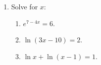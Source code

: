 \begin{enumerate}
	\item	Solve for $x$:
		\begin{enumerate}
			\item $e^{7-4x}=6$.
			\item $\ln(3x-10) = 2$.
			\item $\ln x + \ln (x-1) = 1$.
		\end{enumerate}

\end{enumerate}   



